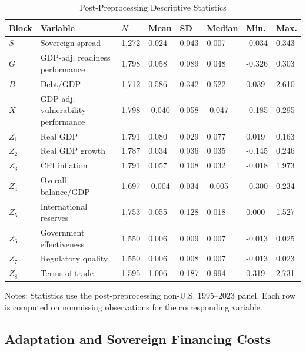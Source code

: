 \begin{table}[H]\centering
\begin{threeparttable}
\caption{Post-Preprocessing Descriptive Statistics}
\label{tab:summary_stats}
\scriptsize
\setlength{\tabcolsep}{2.6pt}
\begin{tabularx}{\textwidth}{llYYYYYY}
\toprule
Block & Variable & $N$ & Mean & SD & Median & Min. & Max. \\
\midrule
$S$ & Sovereign spread & 1,272 & 0.024 & 0.043 & 0.007 & -0.034 & 0.343 \\
$G$ & GDP-adj. readiness performance & 1,798 & 0.058 & 0.089 & 0.048 & -0.326 & 0.303 \\
$B$ & Debt/GDP & 1,712 & 0.586 & 0.342 & 0.522 & 0.039 & 2.610 \\
$X$ & GDP-adj. vulnerability performance & 1,798 & -0.040 & 0.058 & -0.047 & -0.185 & 0.295 \\
$Z_1$ & Real GDP & 1,791 & 0.080 & 0.029 & 0.077 & 0.019 & 0.163 \\
$Z_2$ & Real GDP growth & 1,787 & 0.034 & 0.036 & 0.035 & -0.145 & 0.246 \\
$Z_3$ & CPI inflation & 1,791 & 0.057 & 0.108 & 0.032 & -0.018 & 1.973 \\
$Z_4$ & Overall balance/GDP & 1,697 & -0.004 & 0.034 & -0.005 & -0.300 & 0.234 \\
$Z_5$ & International reserves & 1,753 & 0.055 & 0.128 & 0.018 & 0.000 & 1.527 \\
$Z_6$ & Government effectiveness & 1,550 & 0.006 & 0.009 & 0.007 & -0.013 & 0.025 \\
$Z_7$ & Regulatory quality & 1,550 & 0.006 & 0.008 & 0.007 & -0.013 & 0.023 \\
$Z_8$ & Terms of trade & 1,595 & 1.006 & 0.187 & 0.994 & 0.319 & 2.731 \\
\bottomrule
\end{tabularx}
\begin{tablenotes}[flushleft]\footnotesize
\item Notes: Statistics use the post-preprocessing non-U.S. 1995--2023 panel. Each row is computed on nonmissing observations for the corresponding variable.
\end{tablenotes}
\end{threeparttable}
\end{table}

\subsection{Adaptation and Sovereign Financing Costs}

